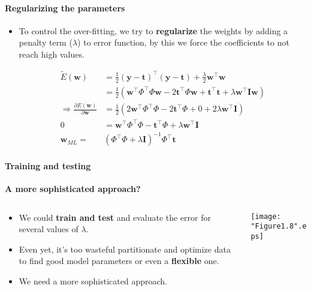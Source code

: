 \begin{frame}{\insertsubsection}
	\framesubtitle{Regularizing the parameters}
		\begin{itemize}
		\item To control the over-fitting, we try to \textcolor{UniOrange}{\textbf{regularize}} the weights by adding a penalty term ($\lambda$) to error function, by this we force the coefficients to not reach high values.

		
				\begin{align*}
					\tilde{E}(\mathbf{w}) &=\frac{1}{2} (\mathbf{y}-\mathbf{t})^{\top}(\mathbf{y}-\mathbf{t}) +\frac{\lambda}{2} \mathbf{w}^{\top}\mathbf{w} \\
									   &= \frac{1}{2} \left( \mathbf{w}^{\top} \Phi^{\top} \Phi \mathbf{w} -  2\mathbf{t}^{\top} \Phi \mathbf{w} + \mathbf{t}^{\top}\mathbf{t} + \lambda \mathbf{w}^{\top}\mathbf{I}\mathbf{w} \right) \\
			\Rightarrow \frac{\partial E(\mathbf{w})}{\partial \mathbf{w}} &= \frac{1}{2} \left( 2 \mathbf{w}^{\top} \Phi^{\top} \Phi  -  2\mathbf{t}^{\top} \Phi + 0 + 2 \lambda \mathbf{w}^{\top} \mathbf{I} \right) \\
					0 &=  \mathbf{w}^{\top} \Phi^{\top} \Phi  -  \mathbf{t}^{\top} \Phi + \lambda \mathbf{w}^{\top} \mathbf{I} \\
					 \mathbf{w}_{ML} = & \left( \Phi^{\top} \Phi + \lambda \mathbf{I} \right)^{-1} \Phi^{\top} \mathbf{t}
		\end{align*}			
		\end{itemize}
\end{frame}

\begin{frame}
	
\end{frame}


\begin{frame}{\insertsubsection}
	\framesubtitle{Training and testing}
	\textcolor{UniGold}{\textbf{A more sophisticated approach?}}
	\begin{columns}
		\begin{column}{0.475\textwidth}
			\begin{itemize}	
			\item We could \textcolor{UniOrange}{\textbf{train and test}} and evaluate the error for several values of $\lambda$.
			\item Even yet, it's too wasteful partitionate and optimize data to find good model parameters or even a \textcolor{UniOrange}{\textbf{flexible}} one.
			\item We need a more sophisticated approach.
			\end{itemize}
		\end{column}
		\begin{column}{0.475\textwidth}
			\begin{center}
			\centering
			\label{fig:Erms-reg}
			\texttt{[image: "Figure1.8".eps]}
			\end{center}
		\end{column}
	\end{columns}		
	\end{frame}


